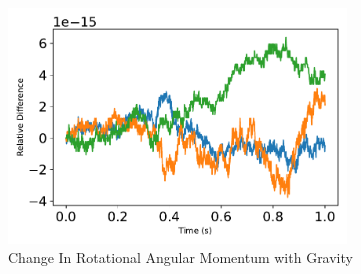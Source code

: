 \begin{figure}[htbp]\centerline{\includegraphics[width=0.8\textwidth]{AutoTeX/ChangeInRotationalAngularMomentumSystem}}\caption{Change In Rotational Angular Momentum with Gravity}\label{fig:ChangeInRotationalAngularMomentumSystem}\end{figure}